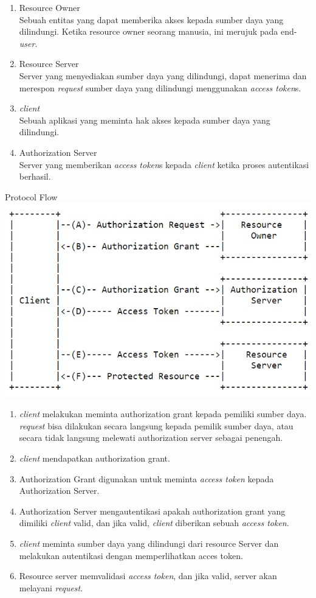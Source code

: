 \begin{enumerate}
	\item Resource Owner\\
	Sebuah entitas yang dapat memberika akses kepada sumber daya yang dilindungi. Ketika resource owner seorang manusia, ini merujuk pada end-\textit{user}.
	\item Resource Server\\
	Server yang menyediakan sumber daya yang dilindungi, dapat menerima dan merespon \textit{request} sumber daya yang dilindungi menggunakan \textit{access token}s.
	\item \textit{client}\\
	Sebuah aplikasi yang meminta hak akses kepada sumber daya yang dilindungi.
	\item Authorization Server\\
	Server yang memberikan \textit{access token}s kepada \textit{client} ketika proses autentikasi berhasil.
\end{enumerate}
Protocol Flow\\
\includegraphics[width=\linewidth]{Gambar/mine/OAuth}
\begin{enumerate}
	\item \textit{client} melakukan meminta authorization grant kepada pemiliki sumber daya. \textit{request} bisa dilakukan secara langsung kepada pemilik sumber daya, atau secara tidak langsung melewati authorization server sebagai penengah.
	\item \textit{client} mendapatkan authorization grant.
	\item Authorization Grant digunakan untuk meminta \textit{access token} kepada Authorization Server.
	\item Authorization Server mengautentikasi apakah authorization grant yang dimiliki \textit{client} valid, dan jika valid, \textit{client} diberikan sebuah \textit{access token}.
	\item \textit{client} meminta sumber daya yang dilindungi dari resource Server dan melakukan autentikasi dengan memperlihatkan acces token.
	\item Resource server memvalidasi \textit{access token}, dan jika valid, server akan melayani \textit{request}.
\end{enumerate}

